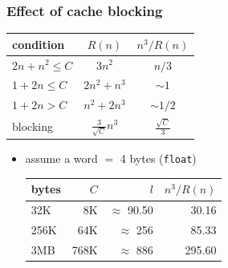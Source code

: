 \documentclass[12pt,dvipdfmx]{beamer}
\newcommand{\ao}[1]{{\color{blue}#1}}
\begin{document}

\begin{frame}[fragile]
\frametitle{Effect of cache blocking}

\begin{center}
\begin{tabular}{|l|c|c|}\hline
condition         & $R(n)$       & $n^3/R(n)$  \\\hline
$2n + n^2 \leq C$ & $3n^2$       & $n/3$       \\\hline
$1 + 2n \leq C$   & $2n^2 + n^3$ & $\sim 1$    \\ \hline
$1 + 2n > C$      & $n^2 + 2n^3$ & $\sim 1/2$   \\\hline
blocking          & ${\displaystyle \frac{3}{\sqrt{C}}} n^3$ & ${\displaystyle \frac{\sqrt{C}}{3}}$ \\\hline
\end{tabular}
\end{center}

\begin{itemize}
\item assume a word $=$ 4 bytes ({\tt float})
\begin{center}
  \begin{tabular}{|l|r|r|r|}\hline
bytes & $C$ & $l$ & $n^3/R(n)$ \\\hline
32K   & 8K  & $\approx$ 90.50  & \ao{30.16}  \\
256K  & 64K & $\approx$ 256 & \ao{85.33}  \\
3MB   & 768K & $\approx$ 886 & \ao{295.60} \\\hline
\end{tabular}
\end{center}
\end{itemize}
\end{frame}
\end{document}
